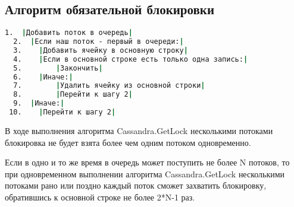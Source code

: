\subsection{Алгоритм обязательной блокировки}

\begin{lstlisting}[language=csh,caption={Алгоритм Cassandra.GetLock(lockId, threadId)}]
  1.  |Добавить поток в очередь|
  2.  |Если наш поток - первый в очереди:|
  3.  	|Добавить ячейку в основную строку|
  4.  	|Если в основной строке есть только одна запись:|
  5.  		|Закончить|
  6.  	|Иначе:|
  7.  		|Удалить ячейку из основной строки|
  8.  		|Перейти к шагу 2|
  9.  |Иначе:|
 10.  	|Перейти к шагу 2|

\end{lstlisting}

\begin{theorem}
В ходе выполнения алгоритма Cassandra.GetLock несколькими потоками блокировка не будет взята более чем одним потоком одновременно.
\end{theorem}

\begin{theorem}
Если в одно и то же время в очередь может поступить не более N потоков, то при одновременном выполнении алгоритма Cassandra.GetLock несколькими потоками рано или поздно каждый поток сможет захватить блокировку, обратившись к основной строке не более 2*N-1 раз.
\end{theorem}